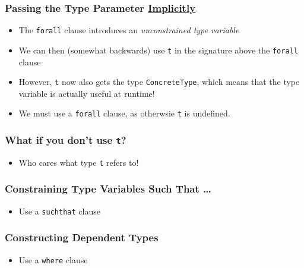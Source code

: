 \begin{frame}[fragile]

\frametitle{Passing the Type Parameter \underline{Implicitly}}


\begin{itemize}

\item The \lstinline{forall} clause introduces an \emph{unconstrained
type variable}

\item We can then (somewhat backwards) use \lstinline{t} in the
signature above the \lstinline{forall} clause

\item However, \lstinline{t} now also gets the type
\lstinline{ConcreteType}, which means that the type variable is
actually useful at runtime!

\item We must use a \lstinline{forall} clause, as otherwsie
\lstinline{t} is undefined.

\end{itemize}

\end{frame}

\begin{frame}[fragile]

\frametitle{What if you don't use \lstinline{t}?}


\begin{itemize}

\item Who cares what type \lstinline{t} refers to!

\end{itemize}

\end{frame}

\begin{frame}

\frametitle{Constraining Type Variables Such That \ldots}



\begin{itemize}

\item Use a \lstinline{suchthat} clause

\end{itemize}

\end{frame}

\begin{frame}

\frametitle{Constructing Dependent Types}



\begin{itemize}

\item Use a \lstinline{where} clause

\end{itemize}

\end{frame}
